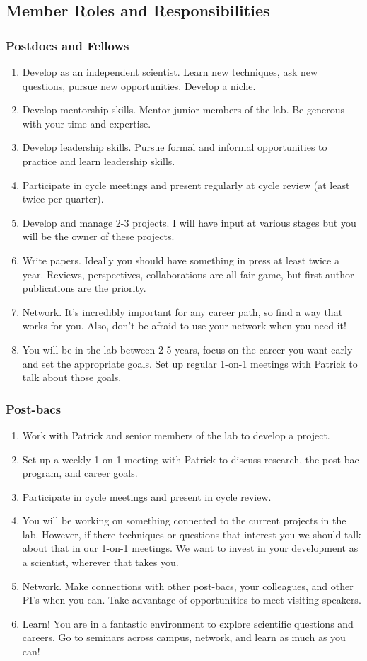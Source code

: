 \documentclass[10pt, letterpaper, twocolumn]{article} %
\begin{document}
\subsection{Member Roles and Responsibilities}

\subsubsection{Postdocs and Fellows}
\begin{enumerate}
\item Develop as an independent scientist. Learn new techniques, ask new questions, pursue new opportunities. Develop a niche.
\item Develop mentorship skills. Mentor junior members of the lab. Be generous with your time and expertise.
\item Develop leadership skills. Pursue formal and informal opportunities to practice and learn leadership skills.
\item Participate in cycle meetings and present regularly at cycle review (at least twice per quarter).
\item Develop and manage 2-3 projects. I will have input at various stages but you will be the owner of these projects.
\item Write papers. Ideally you should have something in press at least twice a year. Reviews, perspectives, collaborations are all fair game, but first author publications are the priority.
\item Network. It's incredibly important for any career path, so find a way that works for you. Also, don't be afraid to use your network when you need it!
\item You will be in the lab between 2-5 years, focus on the career you want early and set the appropriate goals. Set up regular 1-on-1 meetings with Patrick to talk about those goals.
\end{enumerate}
\subsubsection{Post-bacs}
\begin{enumerate}
\item Work with Patrick and senior members of the lab to develop a project.
\item Set-up a weekly 1-on-1 meeting with Patrick to discuss research, the post-bac program, and career goals.
\item Participate in cycle meetings and present in cycle review.
\item You will be working on something connected to the current projects in the lab. However, if there techniques or questions that interest you we should talk about that in our 1-on-1 meetings. We want to invest in your development as a scientist, wherever that takes you.
\item Network. Make connections with other post-bacs, your colleagues, and other PI's when you can. Take advantage of opportunities to meet visiting speakers.
\item Learn! You are in a fantastic environment to explore scientific questions and careers. Go to seminars across campus, network, and learn as much as you can!
\end{enumerate}
\end{document}

